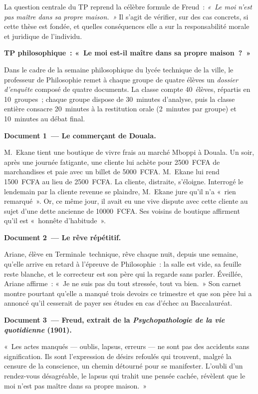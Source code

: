 \documentclass[11pt]{article}
\newcommand{\cle}[1]{{\popxbold\color{popdark}#1}}
\newcounter{popsec}
\newcounter{popsub}
\newcommand{\courssub}[1]{%
  \stepcounter{popsub}%
  \par\vspace{9pt}\noindent{\popxbold\fontsize{11.5}{13}\selectfont\color{popink}{\color{poporange}\thepopsec.\thepopsub}\hspace{6pt}#1}\par\nopagebreak\vspace{4pt}
}
\begin{document}
\begin{aretenir}
La question centrale du TP reprend la célèbre formule de Freud~: \emph{«~Le moi n'est pas maître dans sa propre maison.~»} Il s'agit de vérifier, sur des cas concrets, si cette thèse est fondée, et quelles conséquences elle a sur la \cle{responsabilité} morale et juridique de l'individu.
\end{aretenir}

\courssub{Situation}

\textbf{TP philosophique~: «~Le moi est-il maître dans sa propre maison~?~»}\par

Dans le cadre de la semaine philosophique du lycée technique de la ville, le professeur de Philosophie remet à chaque groupe de quatre élèves un \emph{dossier d'enquête} composé de quatre documents. La classe compte 40~élèves, répartis en 10~groupes~; chaque groupe dispose de 30~minutes d'analyse, puis la classe entière consacre 20~minutes à la restitution orale (2~minutes par groupe) et 10~minutes au débat final.

\textbf{Document 1~— Le commerçant de Douala.}\par
M.~Ekane tient une boutique de vivre frais au marché Mboppi à Douala. Un soir, après une journée fatigante, une cliente lui achète pour \num{2500}~FCFA de marchandises et paie avec un billet de \num{5000}~FCFA. M.~Ekane lui rend \num{1500}~FCFA au lieu de \num{2500}~FCFA. La cliente, distraite, s'éloigne. Interrogé le lendemain par la cliente revenue se plaindre, M.~Ekane jure qu'il n'a «~rien remarqué~». Or, ce même jour, il avait eu une vive dispute avec cette cliente au sujet d'une dette ancienne de \num{10000}~FCFA. Ses voisins de boutique affirment qu'il est «~honnête d'habitude~».

\textbf{Document 2~— Le rêve répétitif.}\par
Ariane, élève en Terminale~technique, rêve chaque nuit, depuis une semaine, qu'elle arrive en retard à l'épreuve de Philosophie~: la salle est vide, sa feuille reste blanche, et le correcteur est son père qui la regarde sans parler. Éveillée, Ariane affirme~: «~Je ne suis pas du tout stressée, tout va bien.~» Son carnet montre pourtant qu'elle a manqué trois devoirs ce trimestre et que son père lui a annoncé qu'il cesserait de payer ses études en cas d'échec au Baccalauréat.

\textbf{Document 3~— Freud, extrait de la \emph{Psychopathologie de la vie quotidienne} (1901).}\par
«~Les actes manqués — oublis, lapsus, erreurs — ne sont pas des accidents sans signification. Ils sont l'expression de désirs refoulés qui trouvent, malgré la censure de la conscience, un chemin détourné pour se manifester. L'oubli d'un rendez-vous désagréable, le lapsus qui trahit une pensée cachée, révèlent que le moi n'est pas maître dans sa propre maison.~»
\end{document}
